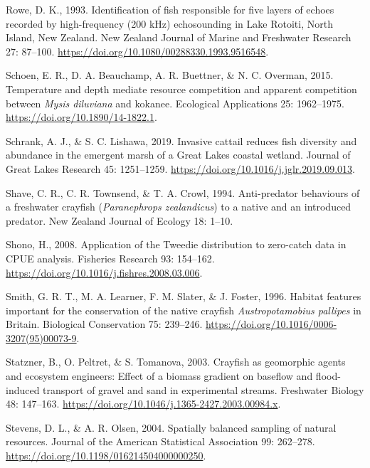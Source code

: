 \documentclass[
  letterpaper,
  DIV=11,
  numbers=noendperiod]{scrartcl}
\newlength{\cslhangindent}
\newenvironment{CSLReferences}[2] %
 {\begin{list}{}{%
  \setlength{\itemindent}{0pt}
  \setlength{\leftmargin}{0pt}
  \setlength{\parsep}{0pt}
  \ifodd #1
   \setlength{\leftmargin}{\cslhangindent}
   \setlength{\itemindent}{-1\cslhangindent}
  \fi
  \setlength{\itemsep}{#2\baselineskip}}}
 {\end{list}}
\begin{document}
\begin{CSLReferences}{0}{1}
Rowe, D. K., 1993. Identification of fish responsible for five layers of
echoes recorded by high-frequency (200 kHz) echosounding in {Lake
Rotoiti}, {North Island, New Zealand}. New Zealand Journal of Marine and
Freshwater Research 27: 87--100.
\url{https://doi.org/10.1080/00288330.1993.9516548}.

Schoen, E. R., D. A. Beauchamp, A. R. Buettner, \& N. C. Overman, 2015.
Temperature and depth mediate resource competition and apparent
competition between {\emph{Mysis diluviana}} and kokanee. Ecological
Applications 25: 1962--1975. \url{https://doi.org/10.1890/14-1822.1}.

Schrank, A. J., \& S. C. Lishawa, 2019. Invasive cattail reduces fish
diversity and abundance in the emergent marsh of a {Great Lakes} coastal
wetland. Journal of Great Lakes Research 45: 1251--1259.
\url{https://doi.org/10.1016/j.jglr.2019.09.013}.

Shave, C. R., C. R. Townsend, \& T. A. Crowl, 1994. Anti-predator
behaviours of a freshwater crayfish ({\emph{Paranephrops zealandicus}})
to a native and an introduced predator. New Zealand Journal of Ecology
18: 1--10.

Shono, H., 2008. Application of the {Tweedie} distribution to zero-catch
data in {CPUE} analysis. Fisheries Research 93: 154--162.
\url{https://doi.org/10.1016/j.fishres.2008.03.006}.

Smith, G. R. T., M. A. Learner, F. M. Slater, \& J. Foster, 1996.
Habitat features important for the conservation of the native crayfish
{\emph{Austropotamobius pallipes}} in {Britain}. Biological Conservation
75: 239--246. \url{https://doi.org/10.1016/0006-3207(95)00073-9}.

Statzner, B., O. Peltret, \& S. Tomanova, 2003. Crayfish as geomorphic
agents and ecosystem engineers: Effect of a biomass gradient on baseflow
and flood-induced transport of gravel and sand in experimental streams.
Freshwater Biology 48: 147--163.
\url{https://doi.org/10.1046/j.1365-2427.2003.00984.x}.

Stevens, D. L., \& A. R. Olsen, 2004. Spatially balanced sampling of
natural resources. Journal of the American Statistical Association 99:
262--278. \url{https://doi.org/10.1198/016214504000000250}.


\end{CSLReferences}
\end{document}
